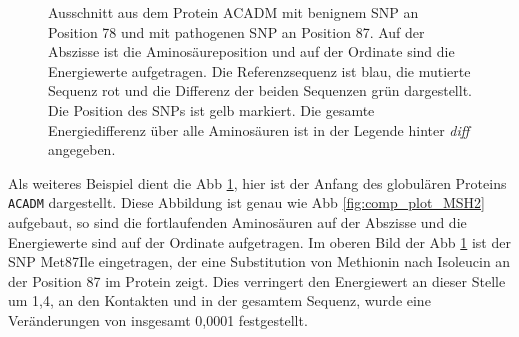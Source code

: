 \begin{figure}
    \centering
    \caption{Ausschnitt aus dem Protein ACADM mit benignem \ac{SNP} an Position 78 und mit pathogenen \ac{SNP} an Position 87. Auf der Abszisse ist die Aminosäureposition und auf der Ordinate sind die Energiewerte aufgetragen. Die Referenzsequenz ist blau, die mutierte Sequenz rot und die Differenz der beiden Sequenzen grün dargestellt. Die Position des \ac{SNP}s ist gelb markiert. Die gesamte Energiedifferenz über alle Aminosäuren ist in der Legende hinter \emph{diff} angegeben.}
    \label{fig:comp_plot_ACADM}
\end{figure}

Als weiteres Beispiel dient die \ac{Abb} \ref{fig:comp_plot_ACADM}, hier ist der Anfang des globulären Proteins \texttt{ACADM} dargestellt. Diese Abbildung ist genau wie \ac{Abb} \ref{fig:comp_plot_MSH2} aufgebaut, so sind die fortlaufenden Aminosäuren auf der Abszisse und die Energiewerte sind auf der Ordinate aufgetragen. Im oberen Bild der \ac{Abb} \ref{fig:comp_plot_ACADM} ist der \ac{SNP} Met87Ile eingetragen, der eine Substitution von Methionin nach Isoleucin an der Position 87 im Protein zeigt. Dies verringert den Energiewert an dieser Stelle um 1,4, an den Kontakten und in der gesamtem Sequenz, wurde eine Veränderungen von insgesamt 0,0001 festgestellt.

